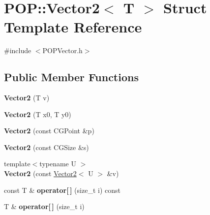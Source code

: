 \hypertarget{struct_p_o_p_1_1_vector2}{}\section{P\+OP\+:\+:Vector2$<$ T $>$ Struct Template Reference}
\label{struct_p_o_p_1_1_vector2}


{\ttfamily \#include $<$P\+O\+P\+Vector.\+h$>$}

\subsection*{Public Member Functions}
\begin{DoxyCompactItemize}
\item 
\mbox{\label{struct_p_o_p_1_1_vector2_a58499bfe6937a3862f7edc3fd85dce06}} 
{\bfseries Vector2} (T v)
\item 
\mbox{\label{struct_p_o_p_1_1_vector2_ab67659be8f73bf35585536b8685a7fb4}} 
{\bfseries Vector2} (T x0, T y0)
\item 
\mbox{\label{struct_p_o_p_1_1_vector2_aad4226a866036f7319671a2ea6895445}} 
{\bfseries Vector2} (const C\+G\+Point \&p)
\item 
\mbox{\label{struct_p_o_p_1_1_vector2_aba025746d868e3637159f99c8c828dde}} 
{\bfseries Vector2} (const C\+G\+Size \&s)
\item 
\mbox{\label{struct_p_o_p_1_1_vector2_a29c19d86228ee4d56f1eb9c229d1f3fc}} 
{\footnotesize template$<$typename U $>$ }\\{\bfseries Vector2} (const \mbox{\hyperlink{struct_p_o_p_1_1_vector2}{Vector2}}$<$ U $>$ \&v)
\item 
\mbox{\label{struct_p_o_p_1_1_vector2_a9766cdb5eb662b38c9d4c61007bdba96}} 
const T \& {\bfseries operator\mbox{[}$\,$\mbox{]}} (size\+\_\+t i) const
\item 
\mbox{\label{struct_p_o_p_1_1_vector2_aaaabf47246c0b0b89ac8076f269363e0}} 
T \& {\bfseries operator\mbox{[}$\,$\mbox{]}} (size\+\_\+t i)
\item 

\end{DoxyCompactItemize}
